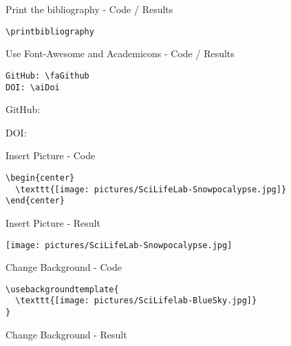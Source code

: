 \documentclass{beamer}
\begin{document}
\begin{frame}[fragile]{Print the bibliography - Code / Results}
\begin{verbatim}
\printbibliography
\end{verbatim}
\printbibliography
\end{frame}

\begin{frame}[fragile]{Use Font-Awesome and Academicons - Code / Results}
\begin{verbatim}
GitHub: \faGithub
DOI: \aiDoi
\end{verbatim}
GitHub: \faGithub

DOI: \aiDoi
\end{frame}

\begin{frame}[fragile]{Insert Picture - Code}
  \begin{verbatim}
\begin{center}
  \texttt{[image: pictures/SciLifeLab-Snowpocalypse.jpg]}
\end{center}
  \end{verbatim}
\end{frame}

\begin{frame}{Insert Picture - Result}
  \begin{center}
    \texttt{[image: pictures/SciLifeLab-Snowpocalypse.jpg]}
  \end{center}
\end{frame}

\begin{frame}[fragile]{Change Background - Code}
  \begin{verbatim}
\usebackgroundtemplate{
  \texttt{[image: pictures/SciLifelab-BlueSky.jpg]}
}
  \end{verbatim}
\end{frame}


\begin{frame}{Change Background - Result}
\end{frame}
\end{document}
